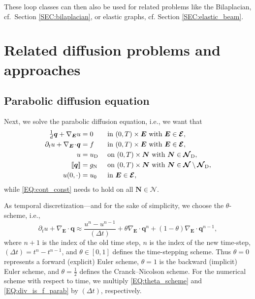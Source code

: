 \documentclass[a4paper, english, 12pt, reqno, draft]{amsart}
\theoremstyle{definition}
\theoremstyle{remark}
\numberwithin{equation}{section}
\newcommand{\SetEdge}{\ensuremath{\boldsymbol{\mathcal E}}}
\newcommand{\SetNode}{\ensuremath{\boldsymbol{\mathcal N}}}
\newcommand{\SetNodeDir}{\ensuremath{\SetNode_\textup D}}
\newcommand{\Edge}{{\ensuremath{\boldsymbol E}}}
\newcommand{\Node}{{\ensuremath{\boldsymbol N}}}
\newcommand{\Nabla}{\ensuremath{\nabla_\Edge}}
\newcommand{\Div}{\ensuremath{\Nabla\!\cdot\!}}
\newcommand{\jump}[1]{{[\![ #1 ]\!]}}
\renewcommand{\vec}[1]{\ensuremath{\boldsymbol{#1}}}
\newcommand{\deltat}{\ensuremath{(\Delta t)}}
\begin{document}
These loop classes can then also be used for related problems like the Bilaplacian, cf.\ Section \ref{SEC:bilaplacian}, or elastic graphs, cf. Section \ref{SEC:elastic_beam}.
% 
\section{Related diffusion problems and approaches}\label{SEC:related_diffusion_problems}
% 
\subsection{Parabolic diffusion equation}\label{SEC:parabolic_diff}
% 
Next, we solve the parabolic diffusion equation, i.e., we want that
% 
\begin{subequations}\label{EQ:diffusion_parab}
\begin{align}
 \tfrac{1}{d} \vec q + \Nabla u & = 0 && \text{ in } (0,T) \times \Edge \text{ with } \Edge \in \SetEdge,\label{EQ:primal_dual_parab}\\
 \partial_t u + \Div \vec q & = f && \text{ in } (0,T) \times \Edge \text{ with } \Edge \in \SetEdge,\label{EQ:div_is_f_parab}\\
 u & = u_\textup D && \text{ on } (0,T) \times \Node \text{ with } \Node \in \SetNodeDir,\label{EQ:dir_cond_parab}\\
 \jump{\vec q} & = g_\textup N && \text{ on } (0,T) \times \Node \text{ with } \Node \in \SetNode \setminus \SetNodeDir,\label{EQ:neu_cond_parab}\\
 u(0,\cdot) & = u_0 && \text{ in } \Edge \in \SetEdge,\label{EQ:initial_parab}
\end{align}
\end{subequations}
% 
while \eqref{EQ:cont_const} needs to hold on all $\Node \in \SetNode$.

As temporal discretization---and for the sake of simplicity, we choose the $\theta$-scheme, i.e.,
% 
\begin{equation}\label{EQ:theta_scheme}
 \partial_t u + \Div \vec q \approx \frac{ u^n - u^{n-1} }{\deltat} + \theta \Div \vec q^n + (1 - \theta) \Div \vec q^{n-1},
\end{equation}
%
where $n+1$ is the index of the old time step, $n$ is the index of the new time-step, $\deltat = t^n - t^{n-1}$, and $\theta \in [0,1]$ defines the time-stepping scheme. Thus $\theta = 0$ represents a forward (explicit) Euler scheme, $\theta = 1$ is the backward (implicit) Euler scheme, and $\theta = \tfrac{1}{2}$ defines the Cranck--Nicolson scheme. For the numerical scheme with respect to time, we multiply \eqref{EQ:theta_scheme} and \eqref{EQ:div_is_f_parab} by $\deltat$, respectively.
\end{document}
